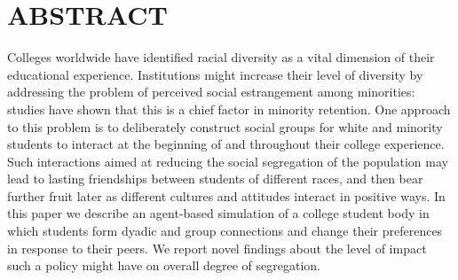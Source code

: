 
\section*{ABSTRACT}

Colleges worldwide have identified racial diversity as a vital dimension of
their educational experience. Institutions might increase their level of
diversity by addressing the problem of perceived social estrangement among
minorities: studies have shown that this is a chief factor in minority
retention. One approach to this problem is to deliberately construct social
groups for white and minority students to interact at the beginning of and
throughout their college experience. Such interactions aimed at reducing the
social segregation of the population may lead to lasting friendships between
students of different races, and then bear further fruit later as different
cultures and attitudes interact in positive ways. In this paper we describe an
agent-based simulation of a college student body in which students form dyadic
and group connections and change their preferences in response to their peers.
We report novel findings about the level of impact such a policy might have on
overall degree of segregation.
